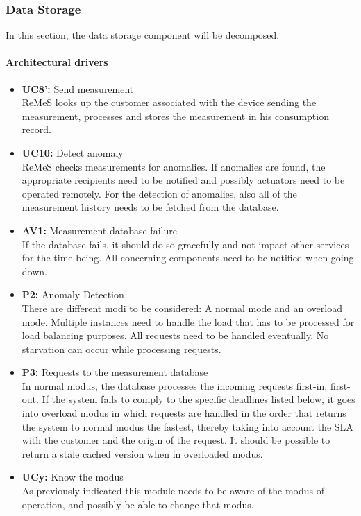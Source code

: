 \subsubsection{Data Storage}
In this section, the data storage component will be decomposed.
\paragraph{Architectural drivers}
\begin{itemize}
	\item \textbf{UC8': } Send measurement\\
	ReMeS looks up the customer associated with the device sending the measurement, processes and stores the measurement in his consumption record.
	\item \textbf{UC10: } Detect anomaly\\
	ReMeS checks measurements for anomalies.
	If anomalies are found, the appropriate recipients need to be notified and possibly actuators need to be operated remotely. For the detection of anomalies, also all of the measurement history needs to be fetched from the database.
	\item \textbf{AV1: } Measurement database failure\\
	If the database fails, it should do so gracefully and not impact other services for the time being. All concerning components need to be notified when going down.
	\item \textbf{P2: } Anomaly Detection\\
	There are different modi to be considered: A normal mode and an overload mode.
	Multiple instances need to handle the load that has to be processed for load balancing purposes.
	All requests need to be handled eventually. No starvation can occur while processing requests.	
	\item \textbf{P3: } Requests to the measurement database\\
	In normal modus, the database processes the incoming requests first-in, first-out.
	If the system fails to comply to the specific deadlines listed below, it goes into overload modus in which requests are handled in the order that returns the system to normal modus the fastest, thereby taking into account the SLA with the customer and the origin of the request.
It should be possible to return a stale cached version when in overloaded modus.	
	\item \textbf{UCy: } Know the modus\\
	As previously indicated this module needs to be aware of the modus of operation, and possibly be able to change that modus.
\end{itemize}
